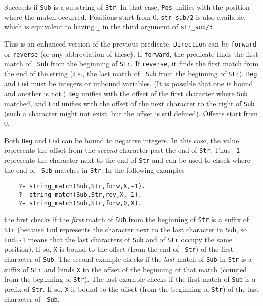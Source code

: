 \begin{description}

Succeeds if {\tt Sub} is a substring of {\tt Str}. In that case, {\tt Pos}
unifies with the position where the match occurred. Positions start
from 0. {\tt str\_sub/2} is also available, which is equivalent
to having {\tt \_} in the third argument of {\tt str\_sub/3}.


This is an enhanced version of the previous predicate.
{\tt Direction} can be {\tt forward} or {\tt reverse} (or any abbreviation
of these). If {\tt forward}, the predicate finds the first match of {\tt
  Sub} from the beginning of {\tt Str}. If {\tt reverse}, it finds the
first match from the end of the string ({\it i.e.}, the last match of {\tt
  Sub} from the beginning of {\tt Str}). {\tt Beg} and {\tt End} must be
integers or unbound variables. (It is possible that one is bound and
another is not.)
{\tt Beg} unifies with the offset of the first character where {\tt Sub}
matched, and {\tt End} unifies with the offset of the next character to the
right of {\tt Sub} (such a character might not exist, but the offset is
stil defined). Offsets start from 0.

Both {\tt Beg} and {\tt End} can be bound to negative integers.
In this case, the value represents the offset from the \emph{second}
character past the end of {\tt Str}. Thus {\tt -1} represents the character
next to the end of {\tt Str} and can be used to check where the end of {\tt
  Sub}  matches in {\tt Str}. In the following examples
\begin{verbatim}
    ?- string_match(Sub,Str,forw,X,-1).  
    ?- string_match(Sub,Str,rev,X,-1).  
    ?- string_match(Sub,Str,forw,0,X).  
\end{verbatim}
the first checks if the \emph{first} match of {\tt Sub} from the beginning
of {\tt Str} is a suffix of {\tt Str} (because {\tt End} represents the
character next to the last character in {\tt Sub}, so {\tt End=-1} means
that the last characters of {\tt Sub} and of {\tt Str} occupy the same
position). If so, {\tt X} is bound to the offset (from the end of {\tt
  Str}) of the first character of {\tt Sub}. The second example checks if
the \emph{last} match of {\tt Sub} in {\tt Str} is a suffix of {\tt Str}
and binds {\tt X} to the offset of the beginning of that match (counted
from the beginning of {\tt Str}).  The last example checks if the first
match of {\tt Sub} is a prefix of {\tt Str}. If so, {\tt X} is bound to the
offset (from the beginning of {\tt Str}) of the last character of {\tt
  Sub}.
 


\end{description}

